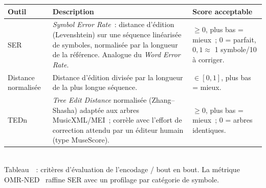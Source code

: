 \documentclass[a4paper,10pt]{article}
\begin{document}
\medskip
\begin{center}
\label{tab:encodage}%
\begin{tabular}{@{}p{2.6cm} p{8.9cm} p{3.4cm}@{}}
\hline
\textbf{Outil} & \textbf{Description} & \textbf{Score acceptable} \\
\hline
SER~\cite{calvozaragoza2018primus} & \emph{Symbol Error Rate}~: distance d'édition (Levenshtein) sur une séquence linéarisée de symboles, normalisée par la longueur de la référence. Analogue du \emph{Word Error Rate}. & $\geq 0$, plus bas = mieux~; $0$ = parfait, $0{,}1 \approx$ 1 symbole/10 à corriger. \\
\hline
Distance normalisée & Distance d'édition divisée par la longueur de la plus longue séquence. & $\in[0,1]$, plus bas = mieux. \\
\hline
TEDn~\cite{riosvila2024tedn} & \emph{Tree Edit Distance} normalisée (Zhang--Shasha) adaptée aux arbres MusicXML/MEI~; corrèle avec l'effort de correction attendu par un éditeur humain (type MuseScore). & $\geq 0$, plus bas = mieux~; $0$ = arbres identiques. \\
\hline
\end{tabular}\\[3pt]
Tableau~\thetable~: critères d'évaluation de l'encodage / bout en bout. La métrique OMR-NED~\cite{martinezsevilla2025omrned} raffine SER avec un profilage par catégorie de symbole.
\end{center}

\normalsize

\newpage


\end{document}
